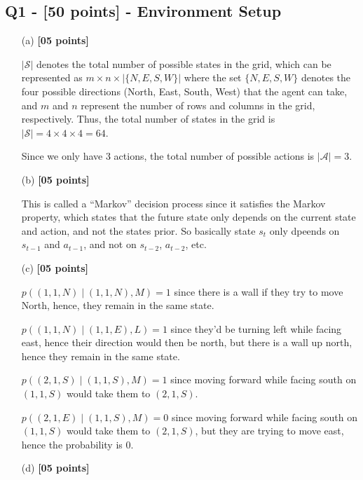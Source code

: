 \subsection*{Q1 - [50 points] - Environment Setup}

\begin{solution}
\begin{enumerate}
    \item[(a)] \textbf{[05 points]} 

    $ |\mathcal{S}| $ denotes the total number of possible states in the grid, which can be represented as $ m \times n \times |\{ N, E, S, W \}| $ where the set $ \{ N, E, S, W \} $ denotes the four possible directions (North, East, South, West) that the agent can take, and $m$ and $n$ represent the number of rows and columns in the grid, respectively. Thus, the total number of states in the grid is $ |\mathcal{S}| = 4 \times 4 \times 4 = 64 $.

    Since we only have 3 actions, the total number of possible actions is $ |\mathcal{A}| = 3 $.


    \item[(b)] \textbf{[05 points]} 
    
    This is called a ``Markov'' decision process since it satisfies the Markov property, which states that the future state only depends on the current state and action, and not the states prior. So basically state $s_t$ only dpeends on $s_{t-1}$ and $a_{t-1}$, and not on $s_{t-2}$, $a_{t-2}$, etc.

    \item[(c)] \textbf{[05 points]}

    $ p((1, 1, N) \mid (1, 1, N), M) = 1 $ since there is a wall if they try to move North, hence, they remain in the same state.

    $ p((1, 1, N) \mid (1, 1, E), L) = 1 $ since they'd be turning left while facing east, hence their direction would then be north, but there is a wall up north, hence they remain in the same state.

    $ p((2, 1, S) \mid (1, 1, S), M) = 1 $ since moving forward while facing south on $(1, 1, S)$ would take them to $(2, 1, S)$.

    $p((2, 1, E) \mid (1, 1, S), M) = 0$ since moving forward while facing south on $(1, 1, S)$ would take them to $(2, 1, S)$, but they are trying to move east, hence the probability is 0.


    \item[(d)] \textbf{[05 points]} 
    

\end{enumerate}
\end{solution}
